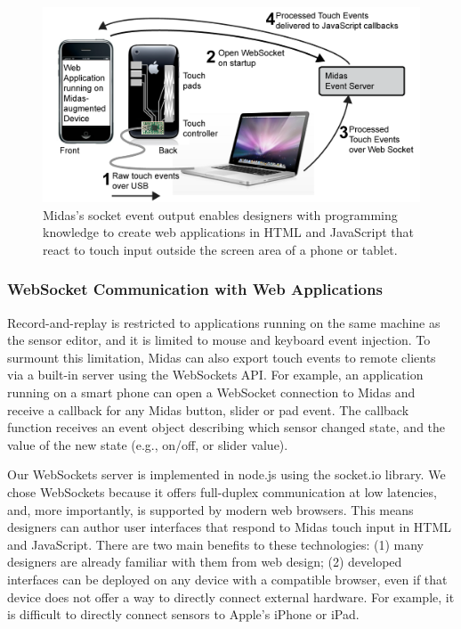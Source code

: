 \begin{figure}[b]
\centering
\includegraphics[width=\textwidth]{figures/midas/socket-events.png}
\caption{Midas's socket event output enables designers with programming knowledge to create web applications in HTML and JavaScript that react to touch input outside the screen area of a phone or tablet.} 
\label{fig:midas-socket}
\end{figure}

\subsubsection{WebSocket Communication with Web Applications}

Record-and-replay is restricted to applications running on the same machine as the sensor editor, and it is limited to mouse and keyboard event injection. To surmount this limitation, Midas can also export touch events to remote clients via a built-in server using the WebSockets API. For example, an application running on a smart phone can open a WebSocket connection to Midas and receive a callback for any Midas button, slider or pad event. The callback function receives an event object describing which sensor changed state, and the value of the new state (e.g., on/off, or slider value).

Our WebSockets server is implemented in node.js using the socket.io library. We chose WebSockets because it offers full-duplex communication at low latencies, and, more importantly, is supported by modern web browsers. This means designers can author user interfaces that respond to Midas touch input in HTML and JavaScript. There are two main benefits to these technologies: (1) many designers are already familiar with them from web design; (2) developed interfaces can be deployed on any device with a compatible browser, even if that device does not offer a way to directly connect external hardware. For example, it is difficult to directly connect sensors to Apple's iPhone or iPad.

